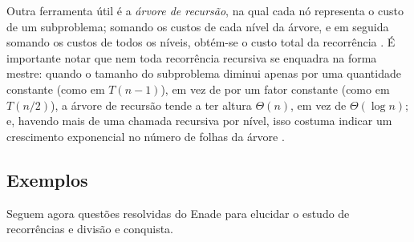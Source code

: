 \documentclass[12pt,a4paper]{article}
\begin{document}
Outra ferramenta útil é a \emph{árvore de recursão}, na qual cada nó representa o custo de um subproblema;
somando os custos de cada nível da árvore, e em seguida somando os custos de todos os níveis,
obtém-se o custo total da recorrência \parencite[seç.~4.4]{clrs2022}.
É importante notar que nem toda recorrência recursiva se enquadra na forma mestre:
quando o tamanho do subproblema diminui apenas por uma quantidade constante (como em $T(n-1)$),
em vez de por um fator constante (como em $T(n/2)$),
a árvore de recursão tende a ter altura $\Theta(n)$, em vez de $\Theta(\log n)$;
e, havendo mais de uma chamada recursiva por nível, isso costuma indicar um crescimento exponencial
no número de folhas da árvore \parencite[cap.~4]{clrs2022}.
\newpage

\subsection{Exemplos}
Seguem agora questões resolvidas do Enade para elucidar o estudo de recorrências e divisão e conquista.
\end{document}
